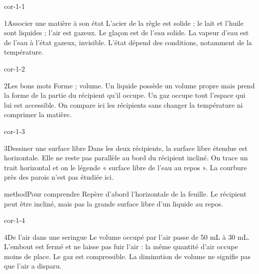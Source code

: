 \documentclass[12pt,twoside,openany]{book}
\begin{document}
\partieCorriges
\clearpage{}
\begin{blocLivre}{cor-1-1}
\begin{corrige}{1}{Associer une matière à son état}
L’acier de la règle est solide ; le lait et l’huile sont liquides ; l’air est gazeux. Le glaçon est de l’eau solide. La vapeur d’eau est de l’eau à l’état gazeux, invisible. L’état dépend des conditions, notamment de la température.\par
\end{corrige}\end{blocLivre}
\begin{blocLivre}{cor-1-2}
\begin{corrige}{2}{Les bons mots}
Forme ; volume. Un liquide possède un volume propre mais prend la forme de la partie du récipient qu’il occupe. Un gaz occupe tout l’espace qui lui est accessible. On compare ici les récipients sans changer la température ni comprimer la matière.\par
\end{corrige}\end{blocLivre}
\begin{blocLivre}{cor-1-3}
\begin{corrige}{3}{Dessiner une surface libre}
Dans les deux récipients, la surface libre étendue est horizontale. Elle ne reste pas parallèle au bord du récipient incliné. On trace un trait horizontal et on le légende « surface libre de l’eau au repos ». La courbure près des parois n’est pas étudiée ici.\par
\begin{pcEncadre}{method}{Pour comprendre}
Repère d’abord l’horizontale de la feuille. Le récipient peut être incliné, mais pas la grande surface libre d’un liquide au repos.\par
\end{pcEncadre}
\end{corrige}\end{blocLivre}
\begin{blocLivre}{cor-1-4}
\begin{corrige}{4}{De l’air dans une seringue}
Le volume occupé par l’air passe de 50 mL à 30 mL. L’embout est fermé et ne laisse pas fuir l’air : la même quantité d’air occupe moins de place. Le gaz est compressible. La diminution de volume ne signifie pas que l’air a disparu.\par
{}
\end{corrige}\end{blocLivre}
\end{document}
